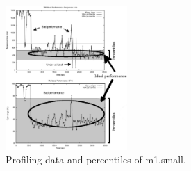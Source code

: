 \begin{figure}[t]
  \begin{center}
    \includegraphics[width=0.8\linewidth, height=5.5cm]{images/idealSmallRemark.pdf}
  \end{center}
\vspace{-3mm}
  \caption{Profiling data and percentiles of m1.small.}
  \label{fig:vm_performance1}
\end{figure}



